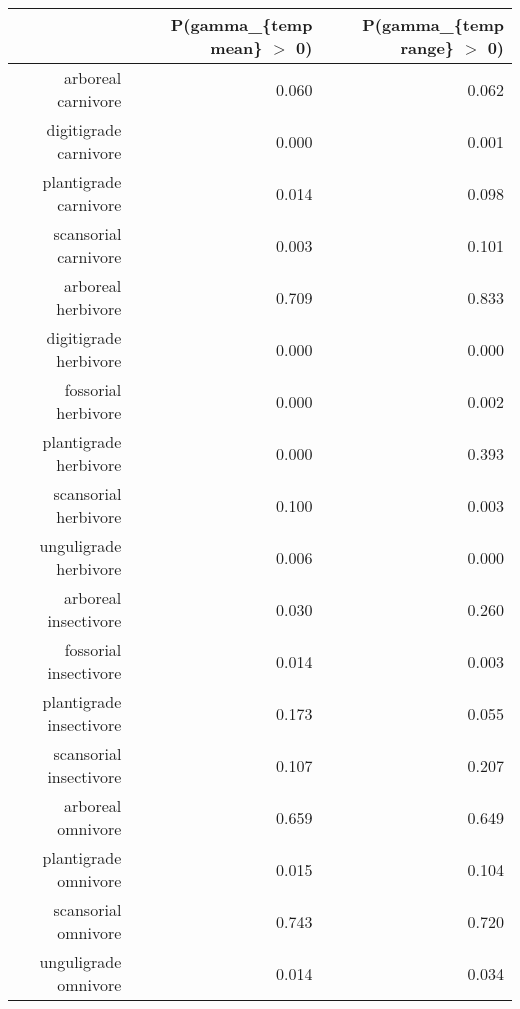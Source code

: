 \begin{table}[ht]
\centering
\begin{tabular}{rrr}
  \hline
 & P(gamma\_\{temp mean\} $>$ 0) & P(gamma\_\{temp range\} $>$ 0) \\ 
  \hline
arboreal carnivore & 0.060 & 0.062 \\ 
  digitigrade carnivore & 0.000 & 0.001 \\ 
  plantigrade carnivore & 0.014 & 0.098 \\ 
  scansorial carnivore & 0.003 & 0.101 \\ 
  arboreal herbivore & 0.709 & 0.833 \\ 
  digitigrade herbivore & 0.000 & 0.000 \\ 
  fossorial herbivore & 0.000 & 0.002 \\ 
  plantigrade herbivore & 0.000 & 0.393 \\ 
  scansorial herbivore & 0.100 & 0.003 \\ 
  unguligrade herbivore & 0.006 & 0.000 \\ 
  arboreal insectivore & 0.030 & 0.260 \\ 
  fossorial insectivore & 0.014 & 0.003 \\ 
  plantigrade insectivore & 0.173 & 0.055 \\ 
  scansorial insectivore & 0.107 & 0.207 \\ 
  arboreal omnivore & 0.659 & 0.649 \\ 
  plantigrade omnivore & 0.015 & 0.104 \\ 
  scansorial omnivore & 0.743 & 0.720 \\ 
  unguligrade omnivore & 0.014 & 0.034 \\ 
   \hline
\end{tabular}
\label{tab:origin_temp}
\end{table}
